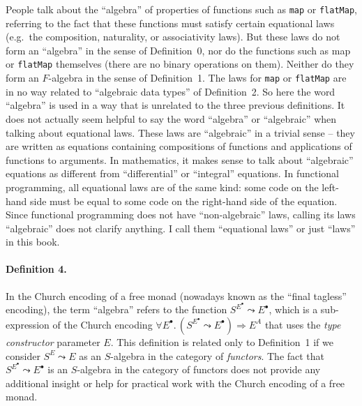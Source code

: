 People talk about the “algebra” of properties of functions such as
\lstinline!map! or \lstinline!flatMap!,
referring to the fact that these functions must satisfy certain equational
laws (e.g.~the composition, naturality, or associativity laws). But
these laws do not form an ``algebra'' in the sense of Definition~0,
nor do the functions such as map or \lstinline!flatMap!
themselves (there are no binary operations on them). Neither do they
form an $F$-algebra in the sense of Definition~1. The laws for \texttt{}\lstinline!map!
or \lstinline!flatMap!
are in no way related to “algebraic data types” of Definition~2.
So here the word “algebra” is used in a way that is unrelated to the
three previous definitions. It does not actually seem helpful to say
the word ``algebra'' or ``algebraic'' when talking about equational
laws. These laws are ``algebraic'' in a trivial sense – they are
written as equations containing compositions of functions and applications
of functions to arguments. In mathematics, it makes sense to talk
about ``algebraic'' equations as different from ``differential''
or ``integral'' equations. In functional programming, all equational
laws are of the same kind: some code on the left-hand side must be
equal to some code on the right-hand side of the equation. Since functional
programming does not have ``non-algebraic'' laws, calling its laws
``algebraic'' does not clarify anything. I call them ``equational
laws'' or just ``laws'' in this book.

\paragraph{Definition 4.}

In the Church encoding of a free monad (nowadays known as the ``final
tagless'' encoding), the term ``algebra'' refers to the function
$S^{E^{\bullet}}\leadsto E^{\bullet}$, which is a sub-expression
of the Church encoding $\forall E^{\bullet}.\,(S^{E^{\bullet}}\leadsto E^{\bullet})\Rightarrow E^{A}$
that uses the \emph{type constructor} parameter $E$. This definition
is related only to Definition~1 if we consider $S^{E}\leadsto E$
as an $S$-algebra in the category of \emph{functors}. The fact that
$S^{E^{\bullet}}\leadsto E^{\bullet}$ is an $S$-algebra in the category
of functors does not provide any additional insight or help for practical
work with the Church encoding of a free monad.

